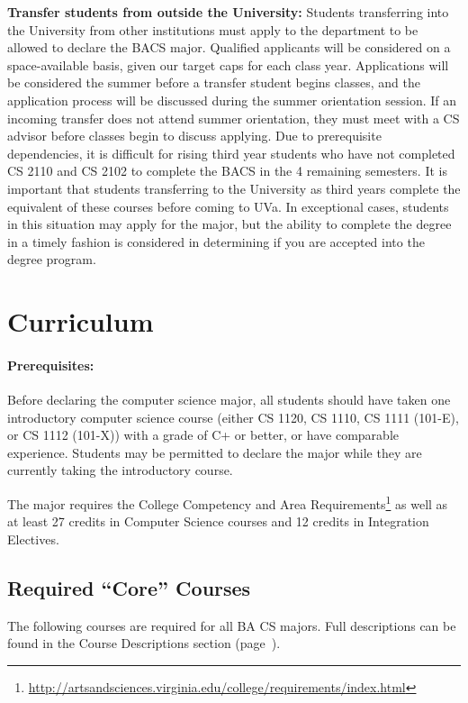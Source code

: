 \documentclass[10pt,letter]{book}
\newcommand{\mysection}[1]{\section{#1}\renewcommand{\rightmark}{#1}}
\newcommand{\myurl}[1]{\footnote{\scriptsize\url{#1}}}
\begin{document}
{\bf Transfer students from outside the University:} Students
transferring into the University from other institutions must apply to
the department to be allowed to declare the BACS major. Qualified
applicants will be considered on a space-available basis, given our
target caps for each class year. Applications will be considered the
summer before a transfer student begins classes, and the application
process will be discussed during the summer orientation session. If an
incoming transfer does not attend summer orientation, they must meet
with a CS advisor before classes begin to discuss applying.  Due to
prerequisite dependencies, it is difficult for rising third year
students who have not completed CS 2110 and CS 2102 to complete the
BACS in the 4 remaining semesters. It is important that students
transferring to the University as third years complete the equivalent
of these courses before coming to UVa. In exceptional cases, students
in this situation may apply for the major, but the ability to complete
the degree in a timely fashion is considered in determining if
you are accepted into the degree program.




\mysection{Curriculum}

\paragraph{Prerequisites:}

Before declaring the computer science major, all students should have
taken one introductory computer science course (either CS 1120,
CS 1110, CS 1111 (101-E), or CS 1112 (101-X)) with a grade of C+
or better, or have comparable experience. Students may be permitted to
declare the major while they are currently taking the introductory
course.

The major requires the College Competency and Area
Requirements\myurl{http://artsandsciences.virginia.edu/college/requirements/index.html}
as well as at least 27 credits in Computer Science courses and 12
credits in Integration Electives.

\subsection{Required ``Core'' Courses}

The following courses are required for all BA CS majors.  Full
descriptions can be found in the Course Descriptions section
(page~\pageref{sec:coursedesc}).
\end{document}

